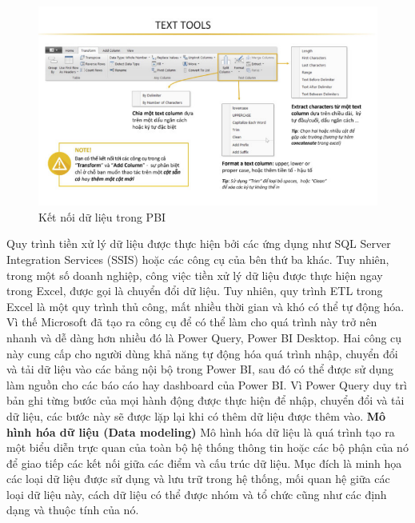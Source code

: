 \begin{center}
            \begin{figure}[!h]
                \centering
                \includegraphics[scale = 1]{figures/Duyen/Tiền xử lý dữ liệu trong PBI.PNG}
              \caption{Kết nối dữ liệu trong PBI}
            \end{figure}
\end{center}
\newpage
Quy trình tiền xử lý dữ liệu được thực hiện bởi các ứng dụng như SQL Server Integration Services (SSIS) hoặc các công cụ của bên thứ ba khác. Tuy nhiên, trong một số doanh nghiệp, công việc tiền xử lý dữ liệu được thực hiện ngay trong Excel, được gọi là chuyển đổi dữ liệu. Tuy nhiên, quy trình ETL trong Excel là một quy trình thủ công, mất nhiều thời gian và khó có thể tự động hóa. \\
Vì thế Microsoft đã tạo ra công cụ để có thể làm cho quá trình này trở nên nhanh và dễ dàng hơn nhiều đó là Power Query, Power BI Desktop. Hai công cụ này cung cấp cho người dùng khả năng tự động hóa quá trình nhập, chuyển đổi và tải dữ liệu vào các bảng nội bộ trong Power BI, sau đó có thể được sử dụng làm nguồn cho các báo cáo hay dashboard của Power BI. Vì Power Query duy trì bản ghi từng bước của mọi hành động được thực hiện để nhập, chuyển đổi và tải dữ liệu, các bước này sẽ được lặp lại khi có thêm dữ liệu được thêm vào.
\textbf{Mô hình hóa dữ liệu (Data modeling)}
Mô hình hóa dữ liệu là quá trình tạo ra một biểu diễn trực quan của toàn bộ hệ thống thông tin hoặc các bộ phận của nó để giao tiếp các kết nối giữa các điểm và cấu trúc dữ liệu. Mục đích là minh họa các loại dữ liệu được sử dụng và lưu trữ trong hệ thống, mối quan hệ giữa các loại dữ liệu này, cách dữ liệu có thể được nhóm và tổ chức cũng như các định dạng và thuộc tính của nó.\\
